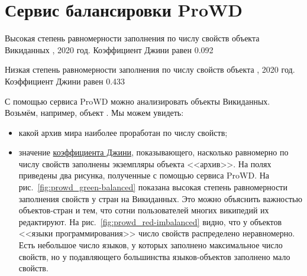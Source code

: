 \chapter{Сервис балансировки ProWD}
\label{ch:prowd}

\begin{marginfigure}[0.0cm]
{
\setlength{\fboxsep}{0pt}%
\setlength{\fboxrule}{1pt}%
}
  \caption[Высокая степень равномерности заполнения по числу свойств объекта Викиданных, 2020 год.]
    {Высокая степень равномерности заполнения по числу свойств объекта Викиданных 
                , 2020 год.
                Коэффициент Джини равен 0.092}%
  \label{fig:prowd_green-balanced}%
\end{marginfigure}

\begin{marginfigure}[0.0cm]
{
\setlength{\fboxsep}{0pt}%
\setlength{\fboxrule}{1pt}%
}
  \caption[Низкая степень равномерности заполнения по числу свойств объекта Викиданных, 2020 год.]
    {Низкая степень равномерности заполнения по числу свойств объекта 
                , 2020 год.
                Коэффициент Джини равен 0.433}%
  \label{fig:prowd_red-imbalanced}%
\end{marginfigure}




С помощью сервиса ProWD можно анализировать объекты Викиданных. 
Возьмём, например, объект . Мы можем увидеть: 
\begin{itemize}
    \item какой архив мира наиболее проработан по числу свойств;

    \item значение \href{https://w.wiki/gg7}{коэффициента Джини}, 
        показывающего, насколько равномерно по числу свойств заполнены экземпляры объекта <<архив>>. 
        На полях приведены два рисунка, полученные с помощью сервиса ProWD. 
        На рис.~\ref{fig:prowd_green-balanced} показана высокая степень 
        равномерности заполнения свойств у стран на Викиданных. 
        Это можно объяснить важностью объектов-стран и тем, что 
        сотни пользователей многих википедий их редактируют.
        На рис.~\ref{fig:prowd_red-imbalanced} видно, что 
        у объектов <<языки программирования>> число свойств распределено неравномерно. 
        Есть небольшое число языков, у которых заполнено максимальное число свойств, 
        но у подавляющего большинства языков-объектов заполнено мало свойств.
\end{itemize}

